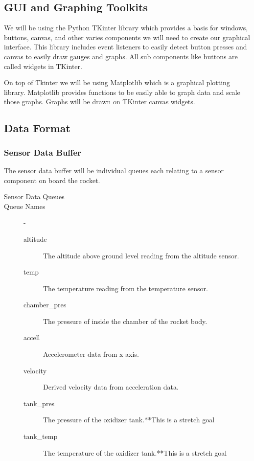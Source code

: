 \documentclass[10pt,draftclsnofoot,onecolumn,compsoc]{IEEEtran}
\begin{document}
\subsection{GUI and Graphing Toolkits}
We will be using the Python TKinter library which provides a basis for windows, buttons, canvas, and other varies components we will need to create our graphical interface. This library includes event listeners to easily detect button presses and canvas to easily draw gauges and graphs. All sub components like buttons are called widgets in TKinter. \par
On top of Tkinter we will be using Matplotlib which is a graphical plotting library. Matplotlib provides functions to be easily able to graph data and scale those graphs. Graphs will be drawn on TKinter canvas widgets.\par

\subsection{Data Format}
\subsubsection{Sensor Data Buffer}
The sensor data buffer will be individual queues each relating to a sensor component on board the rocket.
\begin{description}
	\item[Sensor Data Queues]
	\item[Queue Names]  -
		\begin{description}
			\item[altitude] The altitude above ground level reading from the altitude sensor.
			\item[temp] The temperature reading from the temperature sensor.
			\item[chamber\_pres] The pressure of inside the chamber of the rocket body.
			\item[accell] Accelerometer data from x axis.
			\item[velocity] Derived velocity data from acceleration data.
			\item[tank\_pres] The pressure of the oxidizer tank.**This is a stretch goal
			\item[tank\_temp] The temperature of the oxidizer tank.**This is a stretch goal
			
		\end{description}
\end{description}
\end{document}
